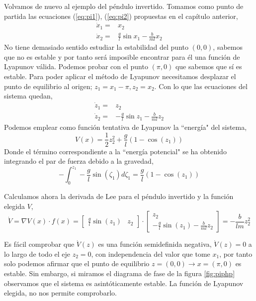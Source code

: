 \begin{example}
Volvamos de nuevo al ejemplo del péndulo invertido. Tomamos como punto de partida las ecuaciones (\ref{eq:pi1}), (\ref{eq:pi2}) propuestas en el capítulo anterior,
\begin{align*}
\dot x_1 = &x_2 \\ 
\dot x_2 = &\frac{g}{l}\sin x_1 - \frac{b}{ml}x_2 
\end{align*}
No tiene demasiado sentido estudiar la estabilidad del punto $(0,0)$, sabemos que no es estable y por tanto será imposible encontrar para él una función de Lyapunov válida. Podemos probar con el punto $(\pi,0)$ que sabemos que sí es estable. Para poder aplicar el método de Lyapunov necesitamos desplazar el punto de equilibrio al origen; $z_1=x_1-\pi,z_2=x_2$. Con lo que las ecuaciones del sistema quedan,
\begin{align*}
\dot z_1 = &z_2 \\ 
\dot z_2 = &-\frac{g}{l}\sin z_1 - \frac{b}{ml}z_2 
\end{align*}
Podemos emplear como función tentativa de Lyapunov la ``energía" del sistema,
\begin{equation*}
V(x) = \frac{1}{2}z_2^2 + \frac{g}{l}\left(1-\cos(z_1)\right)
\end{equation*}
Donde el término correspondiente a la ``energía potencial" se ha obtenido integrando el par de fuerza debido a la gravedad,
\begin{equation*}
-\int_0^{z_1}-\frac{g}{l}\sin(\zeta_1)d\zeta_1 =  \frac{g}{l}\left(1-\cos(z_1)\right)
\end{equation*}

Calculamos ahora la derivada de Lee para el péndulo invertido y la función elegida $V$,
\begin{equation*}
\dot V = \nabla V(x) \cdot f(x) = \begin{bmatrix}
\frac{g}{l}\sin(z_1) & z_2
\end{bmatrix} \cdot
\begin{bmatrix}
z_2\\
 -\frac{g}{l} \sin(z_1) - \frac{b}{ml}z_2 
\end{bmatrix}  = -\frac{b}{lm}z_2^2
\end{equation*}

Es fácil comprobar que $\dot V(z)$ es una función semidefinida negativa, $\dot V(z)=0$ a lo largo de todo el eje $z_2=0$, con independencia del valor que tome $x_1$, por tanto solo podemos afirmar que el punto de equilibrio $z=(0,0) \rightarrow x=(\pi,0)$ es estable. Sin embargo, si miramos el diagrama de fase de la figura \ref{fig:piphp} observamos que el sistema es asintóticamente estable. La función de Lyapunov elegida, no nos permite comprobarlo.


\end{example}
